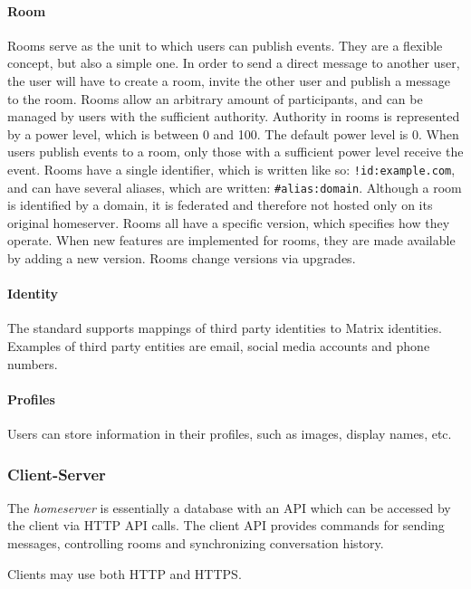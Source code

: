 \paragraph{Room}
Rooms serve as the unit to which users can publish events.
They are a flexible concept, but also a simple one.
In order to send a direct message to another user, the user will have to create a room, invite the other user and publish a message to the room.
Rooms allow an arbitrary amount of participants, and can be managed by users with the sufficient authority.
Authority in rooms is represented by a power level, which is between 0 and 100.
The default power level is 0.
When users publish events to a room, only those with a sufficient power level receive the event.
Rooms have a single identifier, which is written like so: \texttt{!id:example.com}, and can have several aliases, which are written: \texttt{\#alias:domain}.
Although a room is identified by a domain, it is federated and therefore not hosted only on its original homeserver.
Rooms all have a specific version, which specifies how they operate.
When new features are implemented for rooms, they are made available by adding a new version.
Rooms change versions via upgrades.

\paragraph{Identity}
The standard supports mappings of third party identities to Matrix identities.
Examples of third party entities are email, social media accounts and phone numbers.

\paragraph{Profiles}
Users can store information in their profiles, such as images, display names, etc.

\subsubsection{Client-Server}
The \textit{homeserver} is essentially a database with an \ac{API} which can be accessed by the client via \ac{HTTP} \ac{API} calls.
The client \ac{API} provides commands for sending messages, controlling rooms and synchronizing conversation history.

Clients may use both \ac{HTTP} and \ac{HTTPS}.

